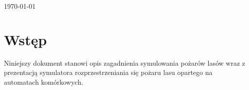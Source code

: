 \documentclass[a4paper, 11pt]{article}
\begin{document}
\begin{titlepage}
		
		
		{\large \today}\\[3cm] %
		
		
		
		
		\vfill %
		
	\end{titlepage}
	
	
	\tableofcontents
	\vfill
	\newpage
	
	
	
	\section{Wstęp}
	\indent
	
	Niniejszy dokument stanowi opis zagadnienia symulowania pożarów lasów wraz z prezentacją symulatora rozprzestrzeniania się pożaru lasu opartego na automatach komórkowych.
	
\end{document}
